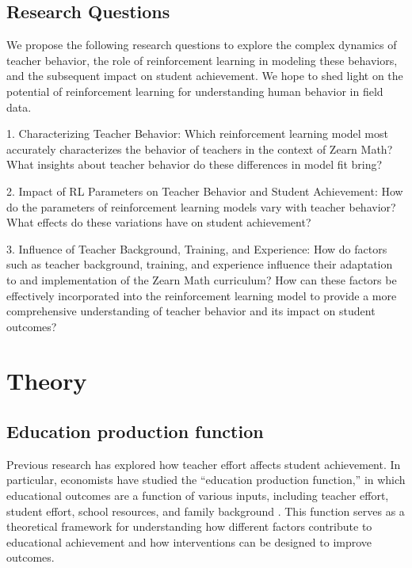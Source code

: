 \documentclass[
  number,
  preprint,
  3p,
  onecolumn]{elsarticle}
\begin{document}
\hypertarget{research-questions}{%
\subsection{Research Questions}\label{research-questions}}

We propose the following research questions to explore the complex
dynamics of teacher behavior, the role of reinforcement learning in
modeling these behaviors, and the subsequent impact on student
achievement. We hope to shed light on the potential of reinforcement
learning for understanding human behavior in field data.

1. Characterizing Teacher Behavior: Which reinforcement learning model
most accurately characterizes the behavior of teachers in the context of
Zearn Math? What insights about teacher behavior do these differences in
model fit bring?

2. Impact of RL Parameters on Teacher Behavior and Student Achievement:
How do the parameters of reinforcement learning models vary with teacher
behavior? What effects do these variations have on student achievement?

3. Influence of Teacher Background, Training, and Experience: How do
factors such as teacher background, training, and experience influence
their adaptation to and implementation of the Zearn Math curriculum? How
can these factors be effectively incorporated into the reinforcement
learning model to provide a more comprehensive understanding of teacher
behavior and its impact on student outcomes?

\hypertarget{theory}{%
\section{Theory}\label{theory}}

\hypertarget{education-production-function}{%
\subsection{Education production
function}\label{education-production-function}}

Previous research has explored how teacher effort affects student
achievement. In particular, economists have studied the ``education
production function,'' in which educational outcomes are a function of
various inputs, including teacher effort, student effort, school
resources, and family background \citep{hedges1994}. This function
serves as a theoretical framework for understanding how different
factors contribute to educational achievement and how interventions can
be designed to improve outcomes.
\end{document}
